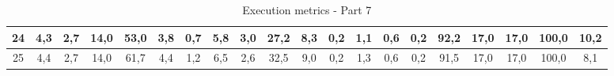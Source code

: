 \begin{sidewaystable}[]
\begin{tabular}{|c|c|c|c|c|c|c|c|c|c|c|c|c|c|c|c|c|c|c|c|}
    24 & 4,3                                              & 2,7                                              & 14,0                                             & 53,0                                             & 3,8                                              & 0,7                                              & 5,8                                              & 3,0                                              & 27,2                                             & 8,3                                              & 0,2                                              & 1,1                                              & 0,6                                              & 0,2                                              & 92,2                                            & 17,0                                            & 17,0                                            & 100,0                                           & 10,2                                            \\ \hline
    25 & 4,4                                              & 2,7                                              & 14,0                                             & 61,7                                             & 4,4                                              & 1,2                                              & 6,5                                              & 2,6                                              & 32,5                                             & 9,0                                              & 0,2                                              & 1,3                                              & 0,6                                              & 0,2                                              & 91,5                                            & 17,0                                            & 17,0                                            & 100,0                                           & 8,1                                             \\ \hline
    \end{tabular}
    \caption{Execution metrics - Part 7}
    \label{tab:ap:exec_metrics_7}
\end{sidewaystable}

